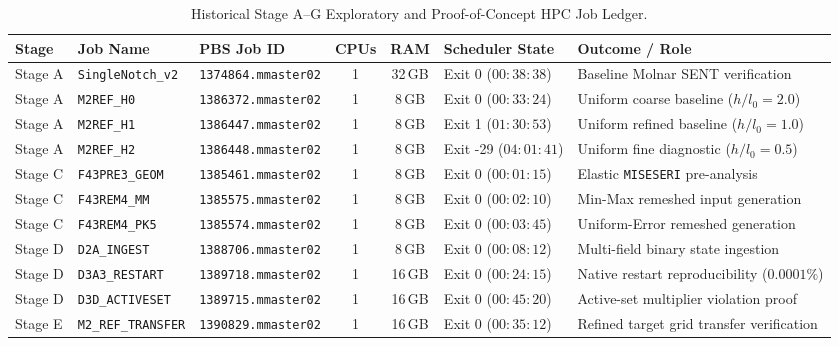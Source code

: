 \begin{table}[htbp]
\centering
\fontsize{6.5}{7.8}\selectfont
\setlength{\tabcolsep}{2.2pt}
\renewcommand{\arraystretch}{0.80}
\caption{Historical Stage A--G Exploratory and Proof-of-Concept HPC Job Ledger.}
\label{tab:app_historical_job_ledger}
\begin{tabularx}{\textwidth}{lllcclX}
\toprule
\textbf{Stage} & \textbf{Job Name} & \textbf{PBS Job ID} & \textbf{CPUs} & \textbf{RAM} & \textbf{Scheduler State} & \textbf{Outcome / Role} \\
\midrule
Stage A & \texttt{SingleNotch\_v2} & \texttt{1374864.mmaster02} & 1 & 32\,GB & Exit 0 ($00{:}38{:}38$) & Baseline Molnar SENT verification \\
Stage A & \texttt{M2REF\_H0} & \texttt{1386372.mmaster02} & 1 & 8\,GB & Exit 0 ($00{:}33{:}24$) & Uniform coarse baseline ($h/l_0 = 2.0$) \\
Stage A & \texttt{M2REF\_H1} & \texttt{1386447.mmaster02} & 1 & 8\,GB & Exit 1 ($01{:}30{:}53$) & Uniform refined baseline ($h/l_0 = 1.0$) \\
Stage A & \texttt{M2REF\_H2} & \texttt{1386448.mmaster02} & 1 & 8\,GB & Exit -29 ($04{:}01{:}41$) & Uniform fine diagnostic ($h/l_0 = 0.5$) \\
\midrule
Stage C & \texttt{F43PRE3\_GEOM} & \texttt{1385461.mmaster02} & 1 & 8\,GB & Exit 0 ($00{:}01{:}15$) & Elastic \texttt{MISESERI} pre-analysis \\
Stage C & \texttt{F43REM4\_MM} & \texttt{1385575.mmaster02} & 1 & 8\,GB & Exit 0 ($00{:}02{:}10$) & Min-Max remeshed input generation \\
Stage C & \texttt{F43REM4\_PK5} & \texttt{1385574.mmaster02} & 1 & 8\,GB & Exit 0 ($00{:}03{:}45$) & Uniform-Error remeshed generation \\
\midrule
Stage D & \texttt{D2A\_INGEST} & \texttt{1388706.mmaster02} & 1 & 8\,GB & Exit 0 ($00{:}08{:}12$) & Multi-field binary state ingestion \\
Stage D & \texttt{D3A3\_RESTART} & \texttt{1389718.mmaster02} & 1 & 16\,GB & Exit 0 ($00{:}24{:}15$) & Native restart reproducibility ($0.0001\%$) \\
Stage D & \texttt{D3D\_ACTIVESET} & \texttt{1389715.mmaster02} & 1 & 16\,GB & Exit 0 ($00{:}45{:}20$) & Active-set multiplier violation proof \\
\midrule
Stage E & \texttt{M2\_REF\_TRANSFER} & \texttt{1390829.mmaster02} & 1 & 16\,GB & Exit 0 ($00{:}35{:}12$) & Refined target grid transfer verification \\

\end{tabularx}
\end{table}

